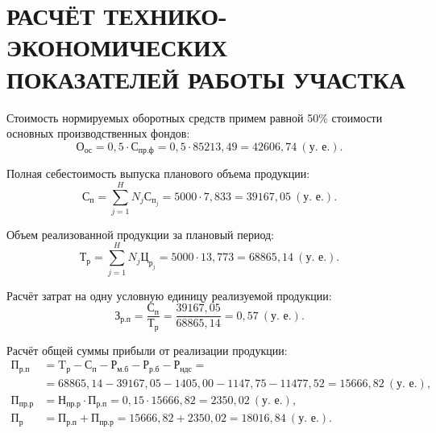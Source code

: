 \section[%
Расчёт технико-экономических показателей работы участка
]{%
РАСЧЁТ ТЕХНИКО-ЭКОНОМИЧЕСКИХ \\
ПОКАЗАТЕЛЕЙ РАБОТЫ УЧАСТКА
}
\label{sec:tep}

Стоимость нормируемых оборотных средств примем равной 50\% стоимости
основных производственных фондов:
\begin{equation*}
  \text{О}_{\text{ос}} = 0{,}5 \cdot \text{С}_{\text{пр.ф}} =
  0{,}5 \cdot 85213{,}49 =
  42606{,}74 \: (\text{у.~е.}).
\end{equation*}

Полная себестоимость выпуска планового объема продукции:
\begin{equation*}
  \text{С}_{\text{п}} = \sum^{H}_{j=1} N_j \text{С}_{\text{п}_j} =
  5000 \cdot 7{,}833 =
  39167{,}05 \: (\text{у.~е.}).
\end{equation*}

Объем реализованной продукции за плановый период:
\begin{equation*}
  \text{Т}_{\text{р}} = \sum^{H}_{j=1} N_j \text{Ц}_{\text{р}_j} =
  5000 \cdot 13{,}773 =
  68865{,}14 \: (\text{у.~е.}).
\end{equation*}

Расчёт затрат на одну условную единицу реализуемой продукции:
\begin{equation*}
  \text{З}_{\text{р.п}} = \dfrac{\text{С}_{\text{п}}}{\text{Т}_{\text{р}}} =
  \dfrac{39167{,}05}{68865{,}14} =
  0{,}57 \: (\text{у.~е.}).
\end{equation*}

Расчёт общей суммы прибыли от реализации продукции:
\begin{align*}
  \text{П}_{\text{р.п}} &= 
  \text{T}_{\text{р}} - \text{С}_{\text{п}} - \text{Р}_{\text{м.б}} - 
  \text{Р}_{\text{р.б}} - \text{Р}_{\text{ндс}} = \\
  &= 68865{,}14 - 39167{,}05 - 1405{,}00 - 1147{,}75 - 11477{,}52 = 
  15666{,}82 \: (\text{у.~е.}), \\
  \text{П}_{\text{пр.р}} &= \text{Н}_{\text{пр.р}} \cdot \text{П}_{\text{р.п}} =
  0{,}15 \cdot 15666{,}82 = 
  2350{,}02 \: (\text{у.~е.}), \\
  \text{П}_{\text{р}} &= \text{П}_{\text{р.п}} + \text{П}_{\text{пр.р}} =
  15666{,}82 + 2350{,}02 = 
  18016{,}84 \: (\text{у.~е.}).
\end{align*}

